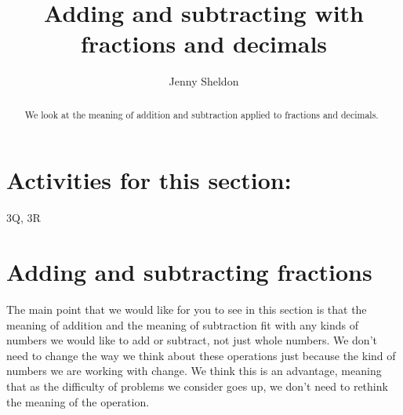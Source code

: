\documentclass{ximera}
\title{Adding and subtracting with fractions and decimals}
\author{Jenny Sheldon}
\begin{document}
\begin{abstract}
We look at the meaning of addition and subtraction applied to fractions and decimals.
\end{abstract}
\maketitle

\section{Activities for this section:} 3Q, 3R

\section{Adding and subtracting fractions}

The main point that we would like for you to see in this section is that the meaning of addition and the meaning of subtraction fit with any kinds of numbers we would like to add or subtract, not just whole numbers. We don't need to change the way we think about these operations just because the kind of numbers we are working with change. We think this is an advantage, meaning that as the difficulty of problems we consider goes up, we don't need to rethink the meaning of the operation. 
\end{document}
